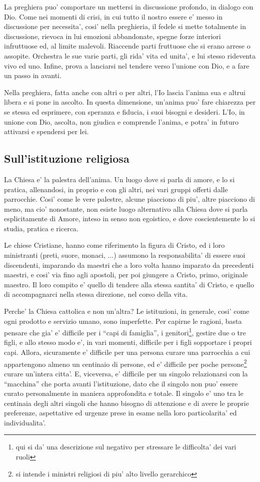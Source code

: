 La preghiera puo' comportare un mettersi in discussione profondo, in dialogo con Dio. Come nei momenti di crisi, in cui tutto il nostro essere e' messo in discussione per necessita', cosi' nella preghieria, il fedele si mette totalmente in discussione, rievoca in lui emozioni abbandonate, spegne forze interiori infruttuose ed, al limite malevoli. Riaccende parti fruttuose che si erano arrese o assopite. Orchestra le sue varie parti, gli rida' vita ed unita', e lui stesso rideventa vivo ed uno. Infine, prova a lanciarsi nel tendere verso l'unione con Dio, e a fare un passo in avanti.

Nella preghiera, fatta anche con altri o per altri, l'Io lascia l'anima sua e altrui libera e si pone in ascolto. In questa dimensione, un'anima puo' fare chiarezza per se stessa ed esprimere, con speranza e fiducia, i suoi bisogni e desideri. 
L'Io, in unione con Dio, ascolta, non giudica e comprende l'anima, e potra' in futuro attivarsi e spendersi per lei.


\subsection{Sull'istituzione religiosa}
La Chiesa e' la palestra dell'anima. Un luogo dove si parla di amore, e lo si pratica, allenandosi, in proprio e con gli altri, nei vari gruppi offerti dalle parrocchie. Cosi' come le vere palestre, alcune piacciono di piu', altre piacciono di meno, ma cio' nonostante, non esiste luogo alternativo alla Chiesa dove si parla esplicitamente di Amore, inteso in senso non egoistico, e dove coscientemente lo si studia, pratica e ricerca. 

Le chiese Cristiane, hanno come riferimento la figura di Cristo, ed i loro ministranti (preti, suore, monaci, ...) assumono la responsabilita' di essere suoi discendenti, imparando da maestri che a loro volta hanno imparato da precedenti maestri, e cosi' via fino agli apostoli, per poi giungere a Cristo, primo, originale maestro. Il loro compito e' quello di tendere alla stessa santita' di Cristo, e quello di accompagnarci nella stessa direzione, nel corso della vita.

Perche' la Chiesa cattolica e non un'altra? Le istituzioni, in generale, cosi' come ogni prodotto e servizio umano, sono imperfette. Per capirne le ragioni, basta pensare che gia' e' difficile per i ``capi di famiglia'', i genitori\footnote{qui si da' una descrizione sul negativo per stressare le difficolta' dei vari ruoli}, gestire due o tre figli, e allo stesso modo e', in vari momenti, difficile per i figli sopportare i propri capi. 
Allora, sicuramente e' difficile per una persona curare una parrocchia a cui appartengono almeno un centinaio di persone, ed e' difficile per poche persone\footnote{si intende i ministri religiosi di piu' alto livello gerarchico} curare un'intera citta'. E, viceversa, e' difficile per un singolo relazionarsi con la ``macchina'' che porta avanti l'istituzione, dato che il singolo non puo' essere curato personalmente in maniera approfondita e totale. Il singolo e' uno tra le centinaia degli altri singoli che hanno bisogno di attenzione e di avere le proprie preferenze, aspettative ed urgenze prese in esame nella loro particolarita' ed individualita'.

